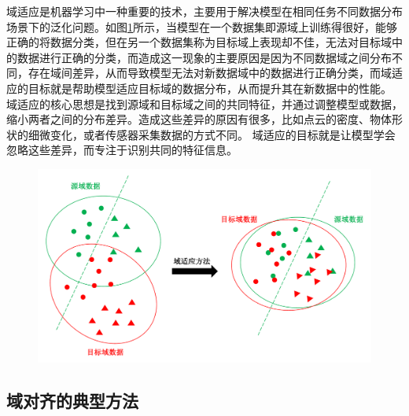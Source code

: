 域适应是机器学习中一种重要的技术，主要用于解决模型在相同任务不同数据分布场景下的泛化问题。如图\ref{fig:2-3}所示，当模型在一个数据集即源域上训练得很好，能够正确的将数据分类，但在另一个数据集称为目标域上表现却不佳，无法对目标域中的数据进行正确的分类，而造成这一现象的主要原因是因为不同数据域之间分布不同，存在域间差异，从而导致模型无法对新数据域中的数据进行正确分类，而域适应的目标就是帮助模型适应目标域的数据分布，从而提升其在新数据中的性能。
域适应的核心思想是找到源域和目标域之间的共同特征，并通过调整模型或数据，缩小两者之间的分布差异。造成这些差异的原因有很多，比如点云的密度、物体形状的细微变化，或者传感器采集数据的方式不同。
域适应的目标就是让模型学会忽略这些差异，而专注于识别共同的特征信息。
\vspace{-0.1cm}
\begin{figure}[h]
    \centering
    \includegraphics[width = \textwidth, scale=0.5]{ljx/figure/2-3DA.pdf}
    \label{fig:2-3}
\end{figure}
\vspace{-0.35cm} 
\subsection{域对齐的典型方法}
